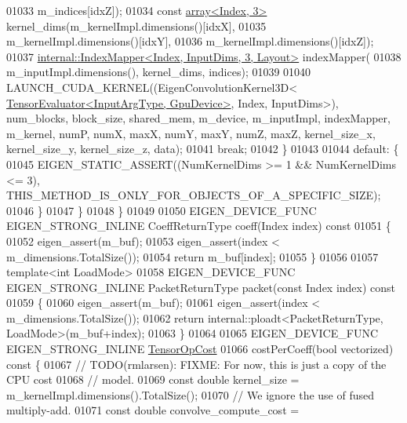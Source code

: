 \begin{DoxyCode}
01033                                       m\_indices[idxZ]);
01034         \textcolor{keyword}{const} \hyperlink{class_eigen_1_1array}{array<Index, 3>} kernel\_dims(m\_kernelImpl.dimensions()[idxX],
01035                                           m\_kernelImpl.dimensions()[idxY],
01036                                           m\_kernelImpl.dimensions()[idxZ]);
01037         \hyperlink{class_eigen_1_1internal_1_1_index_mapper}{internal::IndexMapper<Index, InputDims, 3, Layout>}
       indexMapper(
01038             m\_inputImpl.dimensions(), kernel\_dims, indices);
01039 
01040         LAUNCH\_CUDA\_KERNEL((EigenConvolutionKernel3D<
      \hyperlink{struct_eigen_1_1_tensor_evaluator}{TensorEvaluator<InputArgType, GpuDevice>}, Index, InputDims>), 
      num\_blocks, block\_size, shared\_mem, m\_device, m\_inputImpl, indexMapper, m\_kernel, numP, numX, maxX, numY, maxY, 
      numZ, maxZ, kernel\_size\_x, kernel\_size\_y, kernel\_size\_z, data);
01041         \textcolor{keywordflow}{break};
01042       \}
01043 
01044       \textcolor{keywordflow}{default}: \{
01045         EIGEN\_STATIC\_ASSERT((NumKernelDims >= 1 && NumKernelDims <= 3), 
      THIS\_METHOD\_IS\_ONLY\_FOR\_OBJECTS\_OF\_A\_SPECIFIC\_SIZE);
01046       \}
01047     \}
01048   \}
01049 
01050   EIGEN\_DEVICE\_FUNC EIGEN\_STRONG\_INLINE CoeffReturnType coeff(Index index)\textcolor{keyword}{ const}
01051 \textcolor{keyword}{  }\{
01052     eigen\_assert(m\_buf);
01053     eigen\_assert(index < m\_dimensions.TotalSize());
01054     \textcolor{keywordflow}{return} m\_buf[index];
01055   \}
01056 
01057   \textcolor{keyword}{template}<\textcolor{keywordtype}{int} LoadMode>
01058   EIGEN\_DEVICE\_FUNC EIGEN\_STRONG\_INLINE PacketReturnType packet(\textcolor{keyword}{const} Index index)\textcolor{keyword}{ const}
01059 \textcolor{keyword}{  }\{
01060     eigen\_assert(m\_buf);
01061     eigen\_assert(index < m\_dimensions.TotalSize());
01062     \textcolor{keywordflow}{return} internal::ploadt<PacketReturnType, LoadMode>(m\_buf+index);
01063   \}
01064 
01065   EIGEN\_DEVICE\_FUNC EIGEN\_STRONG\_INLINE \hyperlink{class_eigen_1_1_tensor_op_cost}{TensorOpCost}
01066   costPerCoeff(\textcolor{keywordtype}{bool} vectorized)\textcolor{keyword}{ const }\{
01067     \textcolor{comment}{// TODO(rmlarsen): FIXME: For now, this is just a copy of the CPU cost}
01068     \textcolor{comment}{// model.}
01069     \textcolor{keyword}{const} \textcolor{keywordtype}{double} kernel\_size = m\_kernelImpl.dimensions().TotalSize();
01070     \textcolor{comment}{// We ignore the use of fused multiply-add.}
01071     \textcolor{keyword}{const} \textcolor{keywordtype}{double} convolve\_compute\_cost =

\end{DoxyCode}
